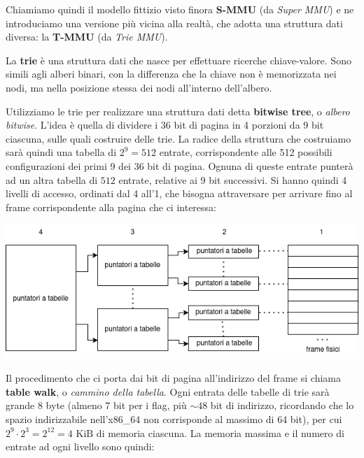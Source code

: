 \documentclass[a4paper,11pt]{article}
\begin{document}
Chiamiamo quindi il modello fittizio visto finora \textbf{S-MMU} (da \textit{Super MMU}) e ne introduciamo una versione più vicina alla realtà, che adotta una struttura dati diversa: la \textbf{T-MMU} (da \textit{Trie MMU}).

La \textbf{trie} è una struttura dati che nasce per effettuare ricerche chiave-valore.
Sono simili agli alberi binari, con la differenza che la chiave non è memorizzata nei nodi, ma nella posizione stessa dei nodi all'interno dell'albero.

Utilizziamo le trie per realizzare una struttura dati detta \textbf{bitwise tree}, o \textit{albero bitwise}.
L'idea è quella di dividere i 36 bit di pagina in 4 porzioni da 9 bit ciascuna, sulle quali costruire delle trie.
La radice della struttura che costruiamo sarà quindi una tabella di $2^9 = 512$ entrate, corrispondente alle 512 possibili configurazioni dei primi 9 dei 36 bit di pagina.
Ognuna di queste entrate punterà ad un altra tabella di $512$ entrate, relative ai 9 bit successivi.
Si hanno quindi 4 livelli di accesso, ordinati dal 4 all'1, che bisogna attraversare per arrivare fino al frame corrispondente alla pagina che ci interessa:

\begin{center}
	\includegraphics[scale=0.6]{../figures/mmu_trie.png}
\end{center}

Il procedimento che ci porta dai bit di pagina all'indirizzo del frame si chiama \textbf{table walk}, o \textit{cammino della tabella}.
Ogni entrata delle tabelle di trie sarà grande 8 byte (almeno 7 bit per i flag, più $\sim 48$ bit di indirizzo, ricordando che lo spazio indirizzabile nell'x86\_64 non corrisponde al massimo di 64 bit), per cui $2^9 \cdot 2^3 = 2^{12} = 4\text{ KiB}$ di memoria ciascuna.
La memoria massima e il numero di entrate ad ogni livello sono quindi:
\end{document}
